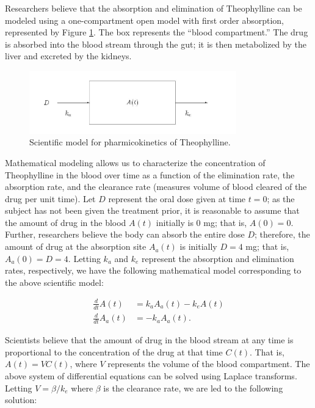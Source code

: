 \documentclass[
]{book}
\theoremstyle{plain}
\theoremstyle{mydefn}
\theoremstyle{myexmpl}
\theoremstyle{remark}
\begin{document}
Researchers believe that the absorption and elimination of Theophylline can be modeled using a one-compartment open model with first order absorption, represented by Figure \ref{fig:nlm-Theophylline-Model}. The box represents the ``blood compartment.'' The drug is absorbed into the blood stream through the gut; it is then metabolized by the liver and excreted by the kidneys.

\begin{figure}

{\centering \includegraphics[width=0.8\textwidth]{images/Theophylline-Model} 

}

\caption{Scientific model for pharmicokinetics of Theophylline.}\label{fig:nlm-Theophylline-Model}
\end{figure}

Mathematical modeling allows us to characterize the concentration of Theophylline in the blood over time as a function of the elimination rate, the absorption rate, and the clearance rate (measures volume of blood cleared of the drug per unit time). Let \(D\) represent the oral dose given at time \(t = 0\); as the subject has not been given the treatment prior, it is reasonable to assume that the amount of drug in the blood \(A(t)\) initially is 0 mg; that is, \(A(0) = 0\). Further, researchers believe the body can absorb the entire dose \(D\); therefore, the amount of drug at the absorption site \(A_a(t)\) is initially \(D = 4\) mg; that is, \(A_a(0) = D = 4\). Letting \(k_a\) and \(k_e\) represent the absorption and elimination rates, respectively, we have the following mathematical model corresponding to the above scientific model:

\[
\begin{aligned}
  \frac{d}{dt} A(t) &= k_a A_a(t) - k_e A(t) \\
  \frac{d}{dt} A_a(t) &= -k_a A_a(t).
\end{aligned}
\]

Scientists believe that the amount of drug in the blood stream at any time is proportional to the concentration of the drug at that time \(C(t)\). That is, \(A(t) = V C(t)\), where \(V\) represents the volume of the blood compartment. The above system of differential equations can be solved using Laplace transforms. Letting \(V = \beta/k_e\) where \(\beta\) is the clearance rate, we are led to the following solution:
\end{document}
